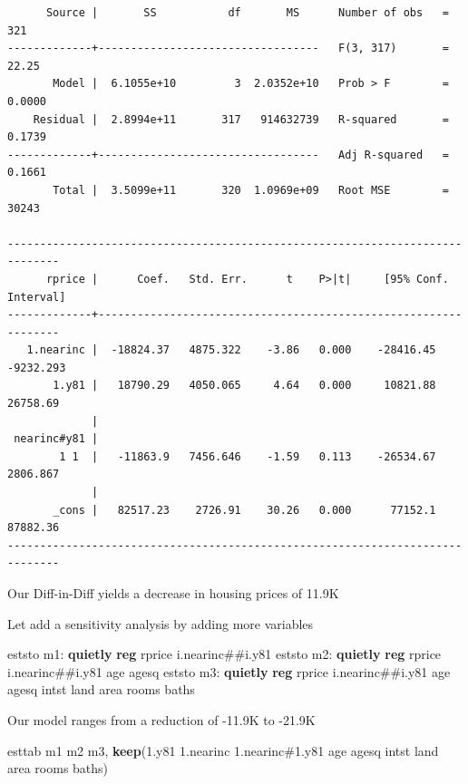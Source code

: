 \documentclass[
]{book}
\newenvironment{Shaded}{\begin{snugshade}}{\end{snugshade}}
\newcommand{\KeywordTok}[1]{\textcolor[rgb]{0.13,0.29,0.53}{\textbf{#1}}}
\newcommand{\NormalTok}[1]{#1}
\begin{document}
\begin{verbatim}
      Source |       SS           df       MS      Number of obs   =       321
-------------+----------------------------------   F(3, 317)       =     22.25
       Model |  6.1055e+10         3  2.0352e+10   Prob > F        =    0.0000
    Residual |  2.8994e+11       317   914632739   R-squared       =    0.1739
-------------+----------------------------------   Adj R-squared   =    0.1661
       Total |  3.5099e+11       320  1.0969e+09   Root MSE        =     30243

------------------------------------------------------------------------------
      rprice |      Coef.   Std. Err.      t    P>|t|     [95% Conf. Interval]
-------------+----------------------------------------------------------------
   1.nearinc |  -18824.37   4875.322    -3.86   0.000    -28416.45   -9232.293
       1.y81 |   18790.29   4050.065     4.64   0.000     10821.88    26758.69
             |
 nearinc#y81 |
        1 1  |   -11863.9   7456.646    -1.59   0.113    -26534.67    2806.867
             |
       _cons |   82517.23    2726.91    30.26   0.000      77152.1    87882.36
------------------------------------------------------------------------------
\end{verbatim}

Our Diff-in-Diff yields a decrease in housing prices of 11.9K

Let add a sensitivity analysis by adding more variables

\begin{Shaded}
\begin{Highlighting}[]
\NormalTok{eststo m1: }\KeywordTok{quietly} \KeywordTok{reg}\NormalTok{ rprice i.nearinc\#\#i.y81}
\NormalTok{eststo m2: }\KeywordTok{quietly} \KeywordTok{reg}\NormalTok{ rprice i.nearinc\#\#i.y81 age agesq}
\NormalTok{eststo m3: }\KeywordTok{quietly} \KeywordTok{reg}\NormalTok{ rprice i.nearinc\#\#i.y81 age agesq intst land area rooms baths}
\end{Highlighting}
\end{Shaded}

Our model ranges from a reduction of -11.9K to -21.9K

\begin{Shaded}
\begin{Highlighting}[]
\NormalTok{esttab m1 m2 m3, }\KeywordTok{keep}\NormalTok{(1.y81 1.nearinc 1.nearinc\#1.y81 age agesq intst land area rooms baths)}
\end{Highlighting}
\end{Shaded}
\end{document}
